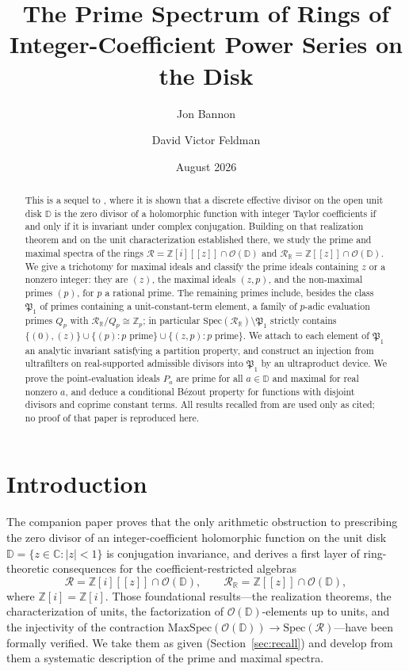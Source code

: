\documentclass[12pt]{amsart}
\title[Prime Spectra of Integer-Coefficient Power Series Rings]{The Prime Spectrum of Rings of\\Integer-Coefficient Power Series on the Disk}
\author{Jon Bannon}
\author{David Victor Feldman}
\date{August 2026}
\theoremstyle{definition}
\newcommand{\D}{\mathbb{D}}
\newcommand{\Z}{\mathbb{Z}}
\newcommand{\Zi}{\mathbb{Z}[i]}
\newcommand{\C}{\mathbb{C}}
\newcommand{\abs}[1]{\left|#1\right|}
\newcommand{\OD}{\mathcal{O}(\D)}
\newcommand{\mR}{\mathcal{R}}
\newcommand{\mRR}{\mathcal{R}_{\mathbb{R}}}
\begin{document}
\maketitle

\begin{abstract}
This is a sequel to \cite{PaperI}, where it is shown that a discrete
effective divisor on the open unit disk $\D$ is the zero divisor of a
holomorphic function with integer Taylor coefficients if and only if it
is invariant under complex conjugation.  Building on that realization
theorem and on the unit characterization established there, we study the
prime and maximal spectra of the rings $\mR = \Zi[[z]] \cap \OD$ and
$\mRR = \Z[[z]] \cap \OD$.  We give a trichotomy for maximal ideals and
classify the prime ideals containing $z$ or a nonzero integer: they are
$(z)$, the maximal ideals $(z,p)$, and the non-maximal primes $(p)$, for
$p$ a rational prime.  The remaining primes include, besides the class $\mathfrak{P}_1$
of primes containing a unit-constant-term element, a family of $p$-adic
evaluation primes $Q_p$ with $\mRR/Q_p \cong \Z_p$; in particular
$\mathrm{Spec}(\mRR) \setminus \mathfrak{P}_1$ strictly contains
$\{(0),(z)\} \cup \{(p) : p \text{ prime}\} \cup \{(z,p) : p
\text{ prime}\}$.  We
attach to each element of $\mathfrak{P}_1$ an analytic invariant
satisfying a partition property, and construct an injection from
ultrafilters on real-supported admissible divisors into $\mathfrak{P}_1$
by an ultraproduct device.  We prove the point-evaluation ideals $P_a$
are prime for all $a \in \D$ and maximal for real nonzero $a$, and deduce
a conditional B\'ezout property for functions with disjoint divisors and
coprime constant terms.  All results recalled from \cite{PaperI} are used
only as cited; no proof of that paper is reproduced here.
\end{abstract}

\section{Introduction}
\label{sec:intro}

The companion paper \cite{PaperI} proves that the only arithmetic
obstruction to prescribing the zero divisor of an integer-coefficient
holomorphic function on the unit disk $\D = \{z \in \C : \abs{z} < 1\}$
is conjugation invariance, and derives a first layer of ring-theoretic
consequences for the coefficient-restricted algebras
\[
  \mR = \Zi[[z]] \cap \OD, \qquad \mRR = \Z[[z]] \cap \OD,
\]
where $\Zi = \Z[i]$.  Those foundational results---the realization
theorems, the characterization of units, the factorization of
$\OD$-elements up to units, and the injectivity of the contraction
$\mathrm{MaxSpec}(\OD) \to \mathrm{Spec}(\mR)$---have been formally
verified.  We take them as given (Section~\ref{sec:recall}) and develop
from them a systematic description of the prime and maximal spectra.
\end{document}
